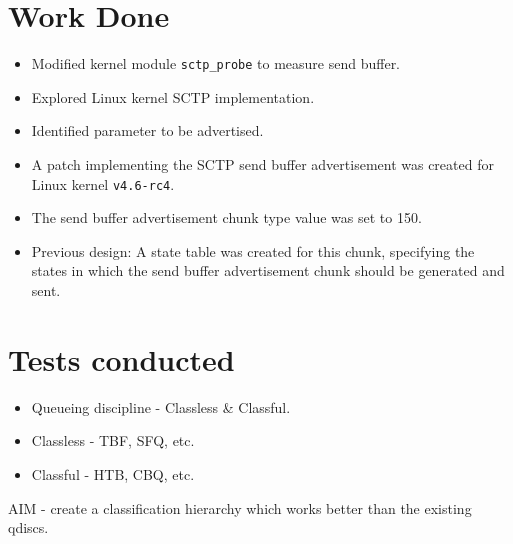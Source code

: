 \documentclass{beamer}
\begin{document}
\section{Work Done}
\begin{frame}{\insertsection}
  \begin{itemize}
    \item Modified kernel module \texttt{sctp\_probe} to measure send buffer.
    \item Explored Linux kernel SCTP implementation.
    \item Identified parameter to be advertised.
    \item A patch implementing the SCTP send buffer advertisement was created for
      Linux kernel \texttt{v4.6-rc4}.
    \item The send buffer advertisement chunk type value was set to 150.
    \item Previous design: A state table was created for this chunk, specifying the states in
      which the send buffer advertisement chunk should be generated and sent.
  \end{itemize}
\end{frame}

\section{Tests conducted}
\begin{frame}{\insertsection}
  \begin{itemize}
    \item Queueing discipline - Classless \& Classful.
    \item Classless - TBF, SFQ, etc.
    \item Classful - HTB, CBQ, etc.
  \end{itemize}
  AIM - create a classification hierarchy which works better than the existing
  qdiscs.

\end{frame}
\end{document}
